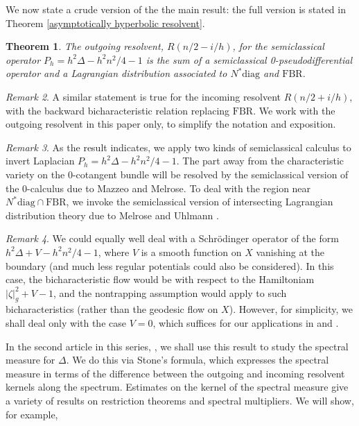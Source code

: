 \documentclass[10pt, a4paper, twoside]{amsart}
\numberwithin{equation}{section}
\newtheorem{theorem}{Theorem}
\theoremstyle{remark}
\newtheorem{remark}[theorem]{Remark}
\begin{document}
We now state a crude version of the the main result: the full version is stated in  Theorem \ref{asymptotically hyperbolic resolvent}. 

\begin{theorem} The outgoing resolvent, $R(n/2 - i/h)$, for the semiclassical operator $P_h = h^2 \Delta - h^2 n^2 /4 - 1$ is the sum of a semiclassical 0-pseudodifferential operator and a Lagrangian distribution associated to $N^* {\mathrm{diag}}$ and ${\mathrm{FBR}}$. 
\end{theorem} 

\begin{remark}
A similar statement is true for the incoming resolvent $R(n/2 + i/h)$, with the backward bicharacteristic relation replacing ${\mathrm{FBR}}$. We work with the outgoing resolvent in this paper only, to simplify the notation and exposition. 
\end{remark} 

 
 \begin{remark} As the result indicates, we apply two kinds of semiclassical calculus to invert Laplacian $P_h = h^2 \Delta - h^2 n^2 / 4 - 1$. The part away from the  characteristic variety on the $0$-cotangent bundle will be resolved by the semiclassical version of the $0$-calculus due to Mazzeo and Melrose. To deal with the region near $N^* {\mathrm{diag}} \cap {\mathrm{FBR}}$, we invoke the semiclassical version of intersecting Lagrangian distribution theory due to Melrose and Uhlmann \cite{Melrose-Uhlmann-CPAM-1979}.
 \end{remark}
 
 \begin{remark} We could equally well deal with a Schr\"odinger operator of the form $h^2 \Delta + V - h^2 n^2/4 -1$, where $V$ is a smooth function on $X$ vanishing at the boundary (and much less regular potentials could also be considered). In this case, the bicharacteristic flow would be with respect to the Hamiltoniam $|\zeta|^2_g + V - 1$, and the nontrapping assumption would apply to such bicharacteristics (rather than the geodesic flow on $X$). However, for simplicity, we shall deal only with the case $V=0$, which suffices for our applications in \cite{Chen-Hassell2} and \cite{Chen-Hassell3}. 
 \end{remark}
 
In the second article in this series, \cite{Chen-Hassell2}, we shall use this result to study the spectral measure for $\Delta$. We do this via Stone's formula, which expresses the spectral measure in terms of the difference between the outgoing and incoming resolvent kernels along the spectrum. Estimates on the kernel of the spectral measure give a variety of results on restriction theorems and spectral multipliers. We will show, for example, 
\end{document}
